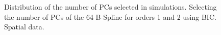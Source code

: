 \documentclass[
]{article}
\begin{document}
\begin{figure}

\begin{minipage}[t]{0.50\linewidth}

{\centering 


}

\end{minipage}%
%
\begin{minipage}[t]{0.50\linewidth}

{\centering 


}

\end{minipage}%

\caption{\label{fig-pc}Distribution of the number of PCs selected in
simulations. Selecting the number of PCs of the 64 B-Spline for orders 1
and 2 using BIC. Spatial data.}

\end{figure}
\newpage
\hypertarget{tbl-pc-ts}{}
\end{document}
